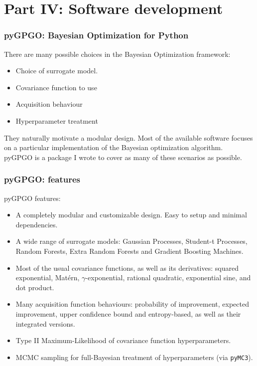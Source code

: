 \documentclass[10pt,usenames,dvipsnames]{beamer}
\begin{document}
\section{Part IV: Software development}
\begin{frame}
\frametitle{pyGPGO: Bayesian Optimization for Python}
There are many possible choices in the Bayesian Optimization framework:
\begin{itemize}
\item Choice of surrogate model.
\item Covariance function to use
\item Acquisition behaviour
\item Hyperparameter treatment
\end{itemize}
They naturally motivate a modular design. Most of the available software focuses on a particular
implementation of the Bayesian optimization algorithm.\\

pyGPGO is a package I wrote to cover as many of these scenarios as possible.
\end{frame}

\begin{frame}
\frametitle{pyGPGO: features}
pyGPGO features:
\begin{itemize}
\item A completely modular and customizable design. Easy to setup and minimal dependencies.
\item A wide range of surrogate models: Gaussian Processes, Student-t Processes, Random Forests, Extra Random Forests and Gradient Boosting Machines.
\item Most of the usual covariance functions, as well as its derivatives: squared exponential, Mat\'ern, $\gamma$-exponential, rational quadratic, exponential sine, and dot product.
\item Many acquisition function behaviours: probability of improvement, expected improvement, upper confidence bound and entropy-based, as well as their integrated versions.
\item Type II Maximum-Likelihood of covariance function hyperparameters.
\item MCMC sampling for full-Bayesian treatment of hyperparameters (via \texttt{pyMC3}).
\end{itemize}
\end{frame}
\end{document}
